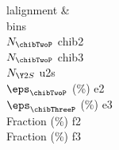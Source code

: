 \begin{tabu}{l{{alignment}}}
&  \\
{{bins}} \\
\hline
$N_{\chibTwoP}$ {{chib2}} \\
$N_{\chibTwoP}$ {{chib3}} \\
$N_{\Y2S}$ {{u2s}} \\
$\eps_{\chibTwoP}$ (\%) {{e2}} \\
$\eps_{\chibThreeP}$ (\%) {{e3}} \\
Fraction \chibTwoP (\%) {{f2}} \\
Fraction \chibThreeP (\%) {{f3}} \\
\end{tabu}